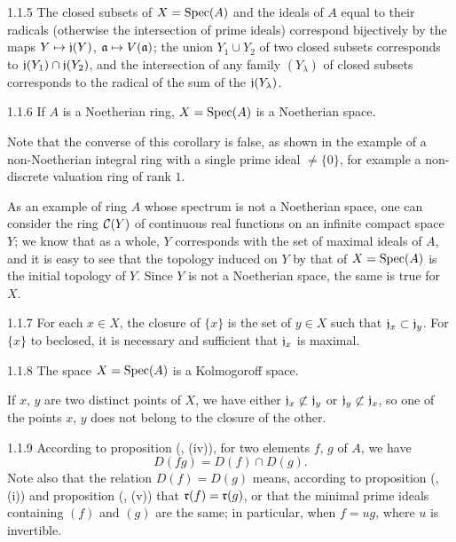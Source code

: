 \documentclass[../main.tex]{subfiles}
\begin{document}
\begin{env}[Corollary]{1.1.5}
The closed subsets of $X=\operatorname{Spec}(A)$ and the ideals of $A$ equal to their radicals (otherwise the
intersection of prime ideals) correspond bijectively by the  maps $Y\mapsto\mathfrak{j}(Y)$,
$\mathfrak{a}\mapsto V(\mathfrak{a})$; the union $Y_1\cup Y_2$ of two closed subsets corresponds to
$\mathfrak{j}(Y_1)\cap\mathfrak{j}(Y_2)$, and the intersection of any family $(Y_\lambda)$ of closed subsets
corresponds to the radical of the sum of the $\mathfrak{j}(Y_\lambda)$.
\end{env}

\begin{env}[Corollary]{1.1.6}
If $A$ is a Noetherian ring, $X=\operatorname{Spec}(A)$ is a Noetherian space.
\end{env}
Note that the converse of this corollary is false, as shown
in the example of a non-Noetherian integral ring with a single prime ideal $\neq\{0\}$, for
example a non-discrete valuation ring of rank $1$.

As an example of ring $A$ whose spectrum is not a Noetherian space, one
can consider the ring $\mathcal{C}(Y)$ of continuous real functions on an infinite compact space
$Y$; we know that as a whole, $Y$ corresponds with the set of maximal ideals
of $A$, and it is easy to see that the topology induced on $Y$ by that of $X=\operatorname{Spec}(A)$
is the initial topology of $Y$. Since $Y$ is not a Noetherian space, the same is true for $X$.

\begin{env}[Corollary]{1.1.7}
For each $x\in X$, the closure of $\{x\}$ is the set of $y\in X$ such that $\mathfrak{j}_x\subset\mathfrak{j}_y$.
For $\{x\}$ to beclosed, it is necessary and sufficient that $\mathfrak{j}_x$ is maximal.
\end{env}

\begin{env}[Corollary]{1.1.8}
The space $X=\operatorname{Spec}(A)$ is a Kolmogoroff space.
\end{env}

If $x$, $y$ are two distinct points of $X$, we have either $\mathfrak{j}_x\not\subset\mathfrak{j}_y$ or
$\mathfrak{j}_y\not\subset\mathfrak{j}_x$, so one of the points $x$, $y$ does not belong to the closure of the other.

\begin{env}{1.1.9}
According to proposition (, (iv)), for two elements $f$, $g$ of $A$, we have
\begin{equation}
  D(fg)=D(f)\cap D(g).\tag{1.1.9.1}
\end{equation}
Note also that the relation $D(f)=D(g)$ means, according to proposition (, (i))
and proposition (, (v)) that $\mathfrak{r}(f)=\mathfrak{r}(g)$, or that the minimal prime ideals
containing $(f)$ and $(g)$ are the same; in particular, when $f=ug$, where $u$ is invertible.
\end{env}
\end{document}
